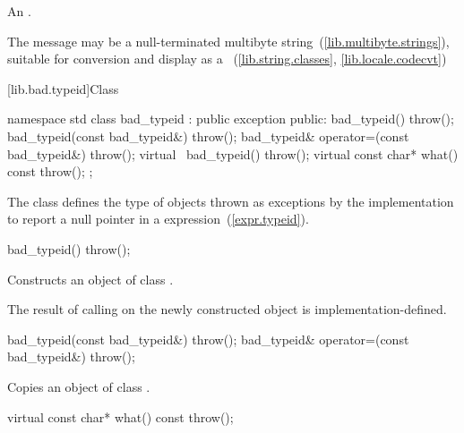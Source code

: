 \begin{itemdescr}
\pnum
\returns
An  \ntbs.%

\pnum
\notes
The message may be a null-terminated multibyte string~(\ref{lib.multibyte.strings}),
suitable for conversion and display as a
~(\ref{lib.string.classes}, \ref{lib.locale.codecvt})
\end{itemdescr}

[lib.bad.typeid]{Class }

%
\begin{codeblock}
namespace std {
  class bad_typeid : public exception {
  public:
    bad_typeid() throw();
    bad_typeid(const bad_typeid&) throw();
    bad_typeid& operator=(const bad_typeid&) throw();
    virtual ~bad_typeid() throw();
    virtual const char* what() const throw();
  };
}
\end{codeblock}

\pnum
The class
defines the type of objects
thrown as exceptions by the implementation to report a null pointer
in a
expression~(\ref{expr.typeid}).

%
\begin{itemdecl}
bad_typeid() throw();
\end{itemdecl}

\begin{itemdescr}
\pnum
\effects
Constructs an object of class
.

\pnum
\notes
The result of calling
on the newly constructed object is implementation-defined.%
\end{itemdescr}

%
%
\begin{itemdecl}
    bad_typeid(const bad_typeid&) throw();
    bad_typeid& operator=(const bad_typeid&) throw();
\end{itemdecl}

\begin{itemdescr}
\pnum
\effects
Copies an object of class
.
\end{itemdescr}

%
\begin{itemdecl}
virtual const char* what() const throw();
\end{itemdecl}

